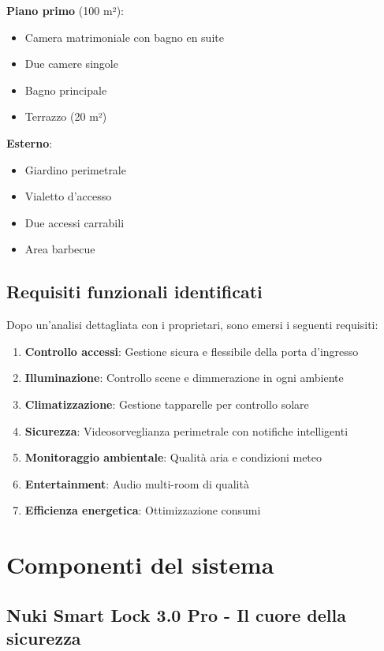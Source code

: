 \textbf{Piano primo} (100 m²):
\begin{itemize}
    \item Camera matrimoniale con bagno en suite
    \item Due camere singole
    \item Bagno principale
    \item Terrazzo (20 m²)
\end{itemize}

\textbf{Esterno}:
\begin{itemize}
    \item Giardino perimetrale
    \item Vialetto d'accesso
    \item Due accessi carrabili
    \item Area barbecue
\end{itemize}

\subsection{Requisiti funzionali identificati}

Dopo un'analisi dettagliata con i proprietari, sono emersi i seguenti requisiti:

\begin{enumerate}
    \item \textbf{Controllo accessi}: Gestione sicura e flessibile della porta d'ingresso
    \item \textbf{Illuminazione}: Controllo scene e dimmerazione in ogni ambiente
    \item \textbf{Climatizzazione}: Gestione tapparelle per controllo solare
    \item \textbf{Sicurezza}: Videosorveglianza perimetrale con notifiche intelligenti
    \item \textbf{Monitoraggio ambientale}: Qualità aria e condizioni meteo
    \item \textbf{Entertainment}: Audio multi-room di qualità
    \item \textbf{Efficienza energetica}: Ottimizzazione consumi
\end{enumerate}

\section{Componenti del sistema}

\subsection{Nuki Smart Lock 3.0 Pro - Il cuore della sicurezza}

